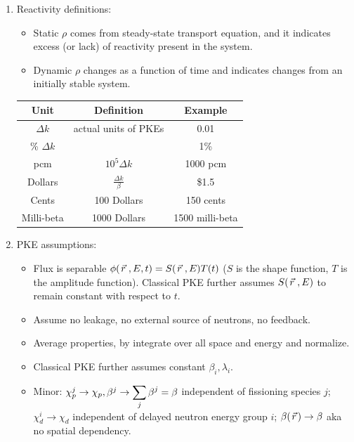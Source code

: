 \documentclass{school-22.211-notes}
\begin{document}
\clearpage
{}
\begin{enumerate}
\item Reactivity definitions: 
\begin{itemize}
  \item Static $\rho$ comes from steady-state transport equation, and it indicates excess (or lack) of reactivity present in the system. 
  \item Dynamic $\rho$ changes as a function of time and indicates changes from an initially stable system. 
\end{itemize}
\begin{table}[ht]
  \centering
  \begin{tabular}{|c|c|c|} \hline
    Unit & Definition & Example \\ \hline
    $\Delta k$ & actual units of PKEs & 0.01 \\
    \% $\Delta k$ & & 1\% \\
    pcm & $10^5 \Delta k $ & 1000 pcm \\ \hline
    Dollars & $\frac{\Delta k}{\beta}$ & \$1.5 \\
    Cents & 100 Dollars & 150 cents \\ 
    Milli-beta & 1000 Dollars & 1500 milli-beta \\ \hline
  \end{tabular}
\end{table}

\item PKE assumptions: 
  \begin{itemize}
  \item Flux is separable $\phi(\left.\vec{r}\right., E, t) = S(\left.\vec{r}\right., E) T(t)$ ($S$ is the shape function, $T$ is the amplitude function). Classical PKE further assumes $S(\left.\vec{r}\right., E)$ to remain constant with respect to $t$. 
  \item Assume no leakage, no external source of neutrons, no feedback. 
  \item Average properties, by integrate over all space and energy and normalize. 
  \item Classical PKE further assumes constant $\beta_i, \lambda_i$. 
  \item Minor: $\chi_p^j \to \chi_p, \beta^j \to \displaystyle\sum_j \beta^j = \beta$ independent of fissioning species $j$; $\chi_d^i \to \chi_d$ independent of delayed neutron energy group $i$; $\beta (\left.\vec{r}\right.) \to \beta$ aka no spatial dependency. 
\end{itemize}


\end{enumerate}
\end{document}

